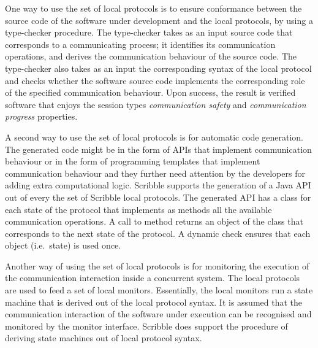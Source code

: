 One way to use the set of local protocols is to ensure
conformance between the source code of the
software under development and the local protocols,
by using a type-checker procedure.
The type-checker takes as an input
source code that corresponds to a communicating process;
it identifies its communication operations,
and derives the communication behaviour of
the
source code.
The type-checker also takes as an input the
corresponding syntax of the local protocol 
and checks whether the 
software source code
implements the corresponding role of the specified communication behaviour.
Upon success, the result is verified software that
enjoys the session types {\em communication safety} and {\em communication progress}
properties.


A second way to use the set of local protocols
is for automatic code generation. The generated
code might be in the form of APIs that implement
communication behaviour or in the form of programming
templates that implement communication behaviour and
they further need attention by the developers for adding
extra computational logic.
Scribble supports the generation of a Java API out of
every the set of Scribble local protocols.
The generated API has a class for each state of the protocol
that implements as methods all the available communication
operations. A call to method returns an object of the class
that corresponds to the next state of the protocol. A dynamic
check ensures that each object (i.e.~state) is used once.


Another way of using the set of local protocols is
for monitoring the execution of the communication
interaction inside a concurrent system.
The local protocols are used to feed a set of local monitors.
Essentially, the local monitors run a state machine that is derived
out of the local protocol syntax.
It is assumed that the communication interaction
of the software under execution can be recognised
and monitored by the monitor interface.
Scribble does support the procedure of deriving
state machines out of local protocol syntax.

